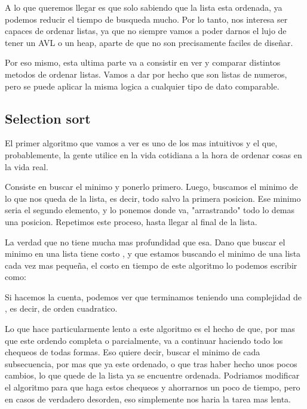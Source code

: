 \documentclass{article}
\begin{document}
A lo que queremos llegar es que solo sabiendo que la lista esta ordenada, ya podemos reducir el tiempo de busqueda mucho. Por lo tanto, nos interesa ser capaces de ordenar listas, ya que no siempre vamos a poder darnos el lujo de tener un AVL o un heap, aparte de que no son precisamente faciles de diseñar.

Por eso mismo, esta ultima parte va a consistir en ver y comparar distintos metodos de ordenar listas. Vamos a dar por hecho que son listas de numeros, pero se puede aplicar la misma logica a cualquier tipo de dato comparable.

\subsection{Selection sort}

El primer algoritmo que vamos a ver es uno de los mas intuitivos y el que, probablemente, la gente utilice en la vida cotidiana a la hora de ordenar cosas en la vida real.

Consiste en buscar el minimo y ponerlo primero. Luego, buscamos el minimo de lo que nos queda de la lista, es decir, todo salvo la primera posicion. Ese minimo seria el segundo elemento, y lo ponemos donde va, "arrastrando" todo lo demas una posicion. Repetimos este proceso, hasta llegar al final de la lista.

La verdad que no tiene mucha mas profundidad que esa. Dano que buscar el minimo en una lista tiene costo , y que estamos buscando el minimo de una lista cada vez mas pequeña, el costo en tiempo de este algoritmo lo podemos escribir como:

\begin{large}
\end{large}

Si hacemos la cuenta, podemos ver que terminamos teniendo una complejidad de , es decir, de orden cuadratico.

Lo que hace particularmente lento a este algoritmo es el hecho de que, por mas que este ordendo completa o parcialmente, va a continuar haciendo todo los chequeos de todas formas. Eso quiere decir, buscar el minimo de cada subsecuencia, por mas que ya este ordenado, o que tras haber hecho unos pocos cambios, lo que quede de la lista ya se encuentre ordenada. Podriamos modificar el algoritmo para que haga estos chequeos y ahorrarnos un poco de tiempo, pero en casos de verdadero desorden, eso simplemente nos haria la tarea mas lenta.
\end{document}
